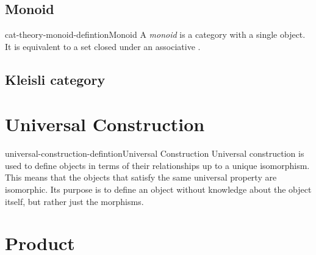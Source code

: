 \documentclass[preview]{standalone}
\begin{document}
\subsection{Monoid}

\begin{snippetdefinition}{cat-theory-monoid-defintion}{Monoid}
    A \textit{monoid} is a category with a single object.
    It is equivalent to a set closed under an associative \binoperation.
\end{snippetdefinition}

\subsection{Kleisli category}


\section{Universal Construction}

\begin{snippetdefinition}{universal-construction-defintion}{Universal Construction}
    Universal construction is used to define objects in terms of their
    relationships up to a unique isomorphism.
    This means that the objects that satisfy the same universal property
    are isomorphic.
    Its purpose is to define an object without knowledge about the object itself,
    but rather just the morphisms.
\end{snippetdefinition}

\section{Product}
\end{document}
